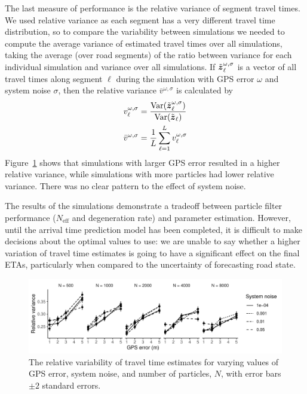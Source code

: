 The last measure of performance is the relative variance of segment travel times.
We used relative variance as each segment has a very different travel time distribution,
so to compare the variability between simulations we needed to 
compute the average variance of estimated travel times over all simulations,
taking the average (over road segments) of the ratio between variance for
each individual simulation and variance over all simulations.
If $\tilde {\boldsymbol{z}}_\ell^{\omega,\sigma}$ is a vector of all travel times
along segment $\ell$ during the simulation with GPS error $\omega$ and system noise $\sigma$,
then the relative variance $\bar v^{\omega,\sigma}$ is calculated by
\begin{equation*}
\begin{split}
v_\ell^{\omega,\sigma} &=
\frac{\mathrm{Var}(\tilde {\boldsymbol{z}}_\ell^{\omega,\sigma})}{\mathrm{Var}(\tilde {\boldsymbol{z}}_\ell)} \\
\bar v^{\omega,\sigma} &=
    \frac{1}{L}\sum_{\ell=1}^L v_\ell^{\omega,\sigma}
\end{split}
\end{equation*}
Figure~\ref{fig:travel_times} shows that simulations with larger GPS error
resulted in a higher relative variance,
while simulations with more particles had lower relative variance.
There was no clear pattern to the effect of system noise.


The results of the simulations
demonstrate a tradeoff between particle filter performance
($N_\text{eff}$ and degeneration rate) and parameter estimation.
However, until the arrival time prediction model has been completed,
it is difficult to make decisions about the optimal values to use:
we are unable to say whether a higher variation of travel time estimates
is going to have a significant effect on the final ETAs,
particularly when compared to the uncertainty of forecasting road state.


\begin{figure}[tb]
    \centering
    \includegraphics[width=\textwidth]{figures/04_model_results_times.pdf}
    \caption{
        The relative variability of travel time estimates for varying
        values of GPS error, system noise, and number of particles, $N$,
        with error bars $\pm 2$ standard errors.
    }
    \label{fig:travel_times}
\end{figure}


